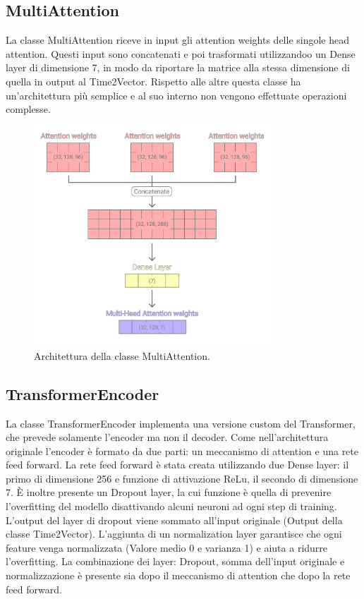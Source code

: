 \documentclass[12pt,a4paper,twoside,openright]{book}
\begin{document}
\subsection{MultiAttention}

La classe MultiAttention riceve in input gli attention weights delle singole head attention. Questi input sono concatenati e poi trasformati utilizzandoo un Dense layer di dimensione 7, in modo da riportare la matrice alla stessa dimensione di quella in output al Time2Vector.
Rispetto alle altre questa classe ha un’architettura più semplice e al suo interno non vengono effettuate operazioni complesse.


\begin{figure}[H]
\centering
\includegraphics[width=0.8\textwidth]{images/multi.png}
\caption{Architettura della classe MultiAttention.}
\label{fig:rapp_file}
\end{figure}

\subsection{TransformerEncoder}

La classe TransformerEncoder implementa una versione custom del Transformer, che prevede solamente l’encoder ma non il decoder. Come nell’architettura originale l’encoder è formato da due parti: un meccanismo di attention e una rete feed forward.
La rete feed forward è stata creata utilizzando due Dense layer: il primo di dimensione 256 e funzione di attivazione ReLu, il secondo di dimensione 7.
È inoltre presente un Dropout layer, la cui funzione è quella di prevenire l’overfitting del modello disattivando alcuni neuroni ad ogni step di training.
L’output del layer di dropout viene sommato all’input originale (Output della classe Time2Vector). 
L’aggiunta di un normalization layer garantisce che ogni feature venga normalizzata (Valore medio 0 e varianza 1) e aiuta a ridurre l’overfitting.
La combinazione dei layer: Dropout, somma dell’input originale e normalizzazione è presente sia dopo il meccanismo di attention che dopo la rete feed forward.
\end{document}
